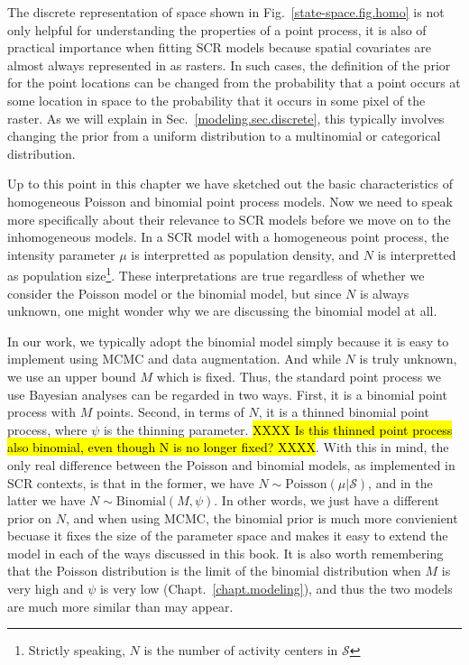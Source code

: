 The discrete representation of space shown in
Fig.~\ref{state-space.fig.homo} is not only helpful for understanding
the properties of a point process, it is also of practical importance
when fitting SCR models because spatial covariates are almost always
represented in as rasters. In such cases, the definition of the prior for
the point locations can be changed from the probability that a point
occurs at some location in space to the probability that it occurs in
some pixel of the raster. As we will explain in
Sec.~\ref{modeling.sec.discrete}, this typically involves changing the
prior from a uniform distribution to a multinomial or categorical
distribution.

Up to this point in this chapter we have sketched out the basic characteristics
of homogeneous Poisson and binomial point process models. Now we need
to speak more specifically about their relevance to SCR models before we move on
to the inhomogeneous models. %
In a SCR model with a homogeneous point process, the intensity
parameter $\mu$ is interpretted as population density, and $N$ is
interpretted as population size\footnote{Strictly speaking, $N$ is the
  number of activity centers in $\mathcal{S}$}. These interpretations
are true regardless of whether we consider the
Poisson model or the binomial model, but since $N$ is always unknown, one
might wonder why we are discussing the binomial model at all. %

In our work, we typically adopt the binomial model simply
because it is easy to implement using MCMC and data
augmentation. And while $N$ is truly unknown, we use an upper bound $M$
which is fixed. Thus, the standard point process we use Bayesian
analyses can be
regarded in two ways. First, it is a binomial point process with $M$
points. Second, in terms of $N$, it is a thinned binomial point
process, where $\psi$ is the thinning parameter.
\hl{XXXX Is this thinned point process also binomial, even though N is
  no longer fixed? XXXX}.
With this in mind,
the only real difference between the Poisson and binomial models, as
implemented in SCR contexts, is that in the former, we have
$N \sim \text{Poisson}(\mu|\mathcal{S})$, and in the latter we have
$N \sim \text{Binomial}(M, \psi)$. In other words, we just have a
different prior on $N$, and when using MCMC, the binomial prior is
much more convienient becuase it fixes the size of the parameter space
and makes it easy to extend the model in each of the ways discussed in
this book. It is also worth remembering that the Poisson
distribution is the limit of the binomial distribution when $M$ is
very high and $\psi$ is very low (Chapt.~\ref{chapt.modeling}), and
thus the two models are much more similar than may appear.

